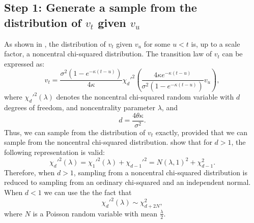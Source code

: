         \subsection*{Step 1: Generate a sample from the distribution of $v_t$ given $v_u$}
            As shown in \cite{CoxRoss1985}, the distribution of $v_t$ given $v_u$ for some $u < t$ is, up to a scale factor, a noncentral chi-squared distribution. The transition law of $v_t$ can be expressed as:
            \begin{equation}
                v_t = \frac{\sigma^2(1-e^{-\kappa(t-u)})}{4\kappa}\chi_d'^{2}\left(\frac{4\kappa e^{-\kappa(t-u)}}{\sigma^2(1-e^{-\kappa(t-u)})} v_u  \right),  \label{BK:vol_law}
            \end{equation}
            where $\chi_d'^{2}(\lambda)$ denotes the noncentral chi-squared random
            variable with $d$ degrees of freedom, and noncentrality
            parameter $\lambda$, and
            \begin{equation}
                d = \frac{4\theta\kappa}{\sigma^2} \label{BK:vol_law:parameter}.
            \end{equation}
            Thus, we can sample from the distribution of $v_t$ exactly,
            provided that we can sample from the noncentral chi-squared distribution.
            \cite{Johnson1994} show that for $d > 1$, the following representation is valid:
            \begin{equation}
                \chi_d'^{2}(\lambda) = \chi_1'^{2}(\lambda) + \chi_{d-1}'^{2} = N(\lambda, 1)^2 + \chi_{d-1}^{2}.
            \end{equation}
            Therefore, when $d > 1$, sampling from a noncentral chi-squared distribution
            is reduced to sampling from an ordinary chi-squared and an independent normal.
            When $d < 1$ we can use the the fact that
            \begin{equation}
                \chi_d'^{2}(\lambda) \sim \chi_{d + 2N}^{2},
            \end{equation}
            where $N$ is a Poisson random variable with mean $\frac{\lambda}{2}$.

